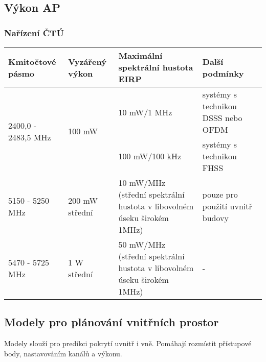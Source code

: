 \documentclass[paper=a4, fontsize=11pt]{scrartcl}
\numberwithin{equation}{section}
\numberwithin{figure}{section}
\numberwithin{table}{section}
\begin{document}
	\subsection{Výkon AP}
		\subsubsection{Nařízení ČTÚ}
		\begin{table}[H]
		\centering
		\begin{tabularx}{\linewidth}{|X|X|X|X|} 
		\hline
		\textcolor[rgb]{0.2,0.2,0.2}{\textbf{Kmitočtové pásmo}}             & \textcolor[rgb]{0.2,0.2,0.2}{\textbf{Vyzářený výkon}}  & \textcolor[rgb]{0.2,0.2,0.2}{\textbf{Maximální spektrální hustota EIRP}}                             & \textcolor[rgb]{0.2,0.2,0.2}{\textbf{Další podmínky}}             \\ 
		\hline
		\multirow{2}{*}{\textcolor[rgb]{0.2,0.2,0.2}{2400,0 - 2483,5 MHz} } & \multirow{2}{*}{\textcolor[rgb]{0.2,0.2,0.2}{100 mW} } & \textcolor[rgb]{0.2,0.2,0.2}{10 mW/1 MHz}                                                            & \textcolor[rgb]{0.2,0.2,0.2}{systémy s technikou DSSS nebo OFDM}  \\ 
		
																		&                                                        & \textcolor[rgb]{0.2,0.2,0.2}{100 mW/100 kHz}                                                         & \textcolor[rgb]{0.2,0.2,0.2}{systémy s technikou FHSS}            \\ 
		\hline
		\textcolor[rgb]{0.2,0.2,0.2}{5150 - 5250 MHz}                       & \textcolor[rgb]{0.2,0.2,0.2}{200 mW střední}           & \textcolor[rgb]{0.2,0.2,0.2}{10 mW/MHz (střední spektrální hustota v libovolném úseku širokém 1MHz)} & \textcolor[rgb]{0.2,0.2,0.2}{pouze pro použití uvnitř budovy}     \\ 
		\hline
		\textcolor[rgb]{0.2,0.2,0.2}{5470 - 5725 MHz}                       & \textcolor[rgb]{0.2,0.2,0.2}{1 W střední}              & \textcolor[rgb]{0.2,0.2,0.2}{50 mW/MHz (střední spektrální hustota v libovolném úseku širokém 1MHz)} & -                                                                 \\
		\hline
		\end{tabularx}
		\end{table}



	\subsection{Modely pro plánování vnitřních prostor}
	Modely slouží pro predikci pokrytí uvnitř i vně. 
	Pomáhají rozmístit přístupové body, 
	nastavováním kanálů a výkonu.
\end{document}
